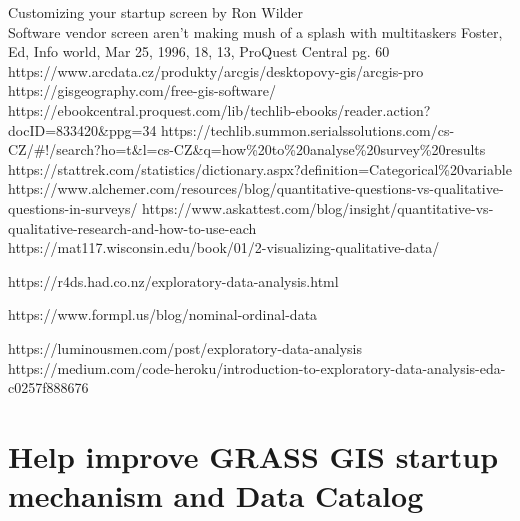 \documentclass[a4paper,10pt,twoside]{article}
\begin{document}
Customizing your startup screen by Ron Wilder \\

Software vendor screen aren't making mush of a splash with multitaskers Foster, Ed, Info world, Mar 25, 1996, 18, 13, ProQuest Central pg. 60 \\

https://www.arcdata.cz/produkty/arcgis/desktopovy-gis/arcgis-pro \\

https://gisgeography.com/free-gis-software/\\

https://ebookcentral.proquest.com/lib/techlib-ebooks/reader.action?docID=833420\&ppg=34
https://techlib.summon.serialssolutions.com/cs-CZ/\#!/search?ho=t\&l=cs-CZ\&q=how\%20to\%20analyse\%20survey\%20results
https://stattrek.com/statistics/dictionary.aspx?definition=Categorical\%20variable
https://www.alchemer.com/resources/blog/quantitative-questions-vs-qualitative-questions-in-surveys/
https://www.askattest.com/blog/insight/quantitative-vs-qualitative-research-and-how-to-use-each
https://mat117.wisconsin.edu/book/01/2-visualizing-qualitative-data/

https://r4ds.had.co.nz/exploratory-data-analysis.html

https://www.formpl.us/blog/nominal-ordinal-data

https://luminousmen.com/post/exploratory-data-analysis
https://medium.com/code-heroku/introduction-to-exploratory-data-analysis-eda-c0257f888676

\newpage
\vspace*{-1cm}
\appendix
\section{Help improve GRASS GIS startup mechanism and Data Catalog }
\label{appendix:A}
\setcounter{page}{1} 
 
\end{document}
